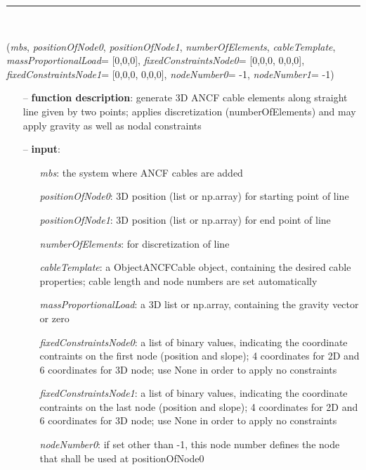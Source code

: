 \begin{itemize}[leftmargin=1.4cm]
\begin{itemize}[leftmargin=1.4cm]
\begin{itemize}[leftmargin=1.4cm]
\begin{itemize}[leftmargin=0.5cm]
\begin{itemize}[leftmargin=1.4cm]
%
\noindent\rule{8cm}{0.75pt}\vspace{1pt} \\ 
\begin{flushleft}
\label{sec:beams:GenerateStraightLineANCFCable}
({\it mbs}, {\it positionOfNode0}, {\it positionOfNode1}, {\it numberOfElements}, {\it cableTemplate}, {\it massProportionalLoad}= [0,0,0], {\it fixedConstraintsNode0}= [0,0,0, 0,0,0], {\it fixedConstraintsNode1}= [0,0,0, 0,0,0], {\it nodeNumber0}= -1, {\it nodeNumber1}= -1)
\end{flushleft}
\setlength{\itemindent}{0.7cm}
\begin{itemize}[leftmargin=0.7cm]
\item[--]
{\bf function description}: generate 3D ANCF cable elements along straight line given by two points; applies discretization (numberOfElements) and may apply gravity as well as nodal constraints
\item[--]
{\bf input}: \vspace{-6pt}
\begin{itemize}[leftmargin=1.2cm]
\setlength{\itemindent}{-0.7cm}
\item[]{\it mbs}: the system where ANCF cables are added
\item[]{\it positionOfNode0}: 3D position (list or np.array) for starting point of line
\item[]{\it positionOfNode1}: 3D position (list or np.array) for end point of line
\item[]{\it numberOfElements}: for discretization of line
\item[]{\it cableTemplate}: a ObjectANCFCable object, containing the desired cable properties; cable length and node numbers are set automatically
\item[]{\it massProportionalLoad}: a 3D list or np.array, containing the gravity vector or zero
\item[]{\it fixedConstraintsNode0}: a list of binary values, indicating the coordinate contraints on the first node (position and slope); 4 coordinates for 2D and 6 coordinates for 3D node; use None in order to apply no constraints
\item[]{\it fixedConstraintsNode1}: a list of binary values, indicating the coordinate contraints on the last node (position and slope); 4 coordinates for 2D and 6 coordinates for 3D node; use None in order to apply no constraints
\item[]{\it nodeNumber0}: if set other than -1, this node number defines the node that shall be used at positionOfNode0

\end{itemize}
\end{itemize}
\end{itemize}
\end{itemize}
\end{itemize}
\end{itemize}
\end{itemize}
